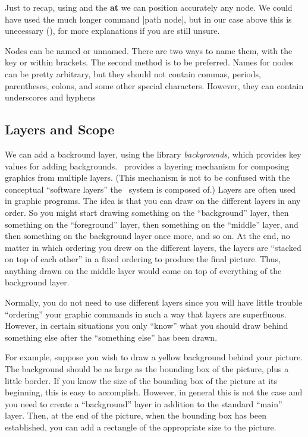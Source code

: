 Just to recap, using  and the \textbf{at} we can position accurately any node. We could have used the much longer command |path node|, but in our case above this is unecessary (), for more explanations if you are still unsure.

Nodes can be named or unnamed. There are two ways to name them, with the key  or within brackets. The second method is to be preferred. Names for nodes can be pretty arbitrary, but they should not contain commas, periods, parentheses, colons, and some other special characters. However, they can contain underscores and hyphens

\subsection{Layers and Scope}

We can add a backround layer, using the library \textit{backgrounds}, which provides key values for adding backgrounds. \pgfname\ provides a layering mechanism for composing graphics from
multiple layers. (This mechanism is not to be confused with the
conceptual ``software layers'' the \pgfname\ system is composed of.)
Layers are often used in graphic programs. The idea is that you can
draw on the different layers in any order. So you might start drawing
something on the ``background'' layer, then something on the
``foreground'' layer, then something on the ``middle'' layer, and then
something on the background layer once more, and so on. At the end, no
matter in which ordering you drew on the different layers, the layers
are ``stacked on top of each other'' in a fixed ordering to produce
the final picture. Thus, anything drawn on the middle layer would come
on top of everything of the background layer.

Normally, you do not need to use different layers since you will have
little trouble ``ordering'' your graphic commands in such a way that
layers are superfluous. However, in certain situations you only
``know'' what you should draw behind something else after the
``something else'' has been drawn.

For example, suppose you wish to draw a yellow background behind your
picture. The background should be as large as the bounding box of the
picture, plus a little border. If you know the size of the bounding box
of the picture at its beginning, this is easy to accomplish. However,
in general this is not the case and you need to create a
``background'' layer in addition to the standard ``main'' layer. Then,
at the end of the picture, when the bounding box has been established,
you can add a rectangle of the appropriate size to the picture.

